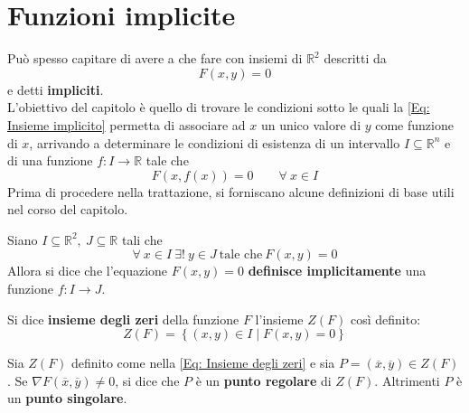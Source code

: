 \chapter{Funzioni implicite}
Può spesso capitare di avere a che fare con insiemi di $\mathbb{R}^2$ descritti da
\begin{equation} \label{Eq: Insieme implicito}
    F(x,y)=0 
\end{equation}
e detti \textbf{impliciti}.\\
L'obiettivo del capitolo è quello di trovare le condizioni sotto le quali la \eqref{Eq: Insieme implicito} permetta di associare ad $x$ un unico valore di $y$ come funzione di $x$,  arrivando a determinare le condizioni di esistenza di un intervallo $I \subseteq \mathbb{R}^n$ e di una funzione $f: I \to \mathbb{R}$ tale che
\begin{equation} \label{Eq: Scopo capitolo 3}
    F(x, f(x))=0 \qquad \forall\ x \in I
\end{equation}
Prima di procedere nella trattazione, si forniscano alcune definizioni di base utili nel corso del capitolo.
\begin{definition} \label{Def: Funzione implicita}
    Siano $I \subseteq \mathbb{R}^2,\ J \subseteq \mathbb{R}$ tali che
    \begin{equation}
        \forall\ x\in I\ \exists!\ y \in J\ \text{tale che}\ F(x,y)=0
    \end{equation}
    Allora si dice che l'equazione $F(x,y)=0$ \textbf{definisce implicitamente} una funzione $f: I \to J$.
\end{definition}
\begin{definition} \label{Def: Insieme degli zeri}
    Si dice \textbf{insieme degli zeri} della funzione $F$ l'insieme $Z(F)$ così definito:
    \begin{equation} \label{Eq: Insieme degli zeri}
        Z(F)=\left\{(x,y) \in I \mid F(x, y)=0 \right\}
    \end{equation}
\end{definition}
\begin{definition}
    Sia $Z(F)$ definito come nella \eqref{Eq: Insieme degli zeri} e sia $P=(\overline{x}, \overline{y}) \in Z(F)$. Se $\nabla F(\overline{x}, \overline{y})\neq 0$, si dice che $P$ è un \textbf{punto regolare} di $Z(F)$. Altrimenti $P$ è un \textbf{punto singolare}.
\end{definition}
